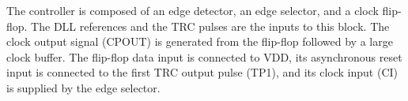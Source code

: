 \documentclass[graybox]{svmult}
\begin{document}
The controller is composed of an edge detector, an edge selector, and a clock flip-flop.
The DLL references and the TRC pulses are the inputs to this block.
The clock output signal (CPOUT) is generated from the flip-flop followed by a large clock buffer.
The flip-flop data input is connected to VDD, its asynchronous reset input is connected to the first TRC output pulse (TP1), and its clock input (CI) is supplied by the edge selector.
\end{document}
